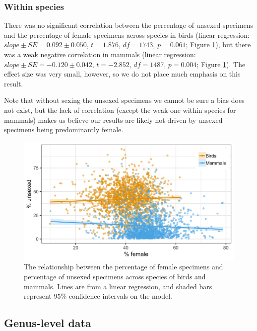 \documentclass[a4paper, 12pt]{article}
\begin{document}
\subsubsection*{Within species}
There was no significant correlation between the percentage of unsexed specimens and the percentage of female specimens across species in birds (linear regression: $slope \pm SE = 0.092 \pm 0.050$, $t = 1.876$, $df = 1743$, $p = 0.061$; Figure \ref{fig-nosex-correlation2}), but there was a weak negative correlation in mammals (linear regression: $slope \pm SE = -0.120 \pm 0.042$, $t = -2.852$, $df = 1487$, $p = 0.004$; Figure \ref{fig-nosex-correlation2}). 
The effect size was very small, however, so we do not place much emphasis on this result.

Note that without sexing the unsexed specimens we cannot be sure a bias does not exist, but the lack of correlation (except the weak one within species for mammals) makes us believe our results are likely not driven by unsexed specimens being predominantly female.

\begin{figure}[H]
 \centering
  \includegraphics[width = \linewidth]{figures/nosex-binomial-correlation.png}
  \caption{The relationship between the percentage of female specimens and percentage of unsexed specimens across species of birds and mammals.
  Lines are from a linear regression, and shaded bars represent 95\% confidence intervals on the model.}
  \label{fig-nosex-correlation2}
\end{figure}

\subsection*{Genus-level data}
\end{document}

